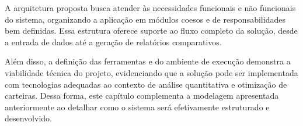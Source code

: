 \documentclass[
	12pt,				%
	openright,			%
	oneside,			    %
	a4paper,				%
	english,			%
	french,			%
	spanish,			%
	brazil			%
	]{abntex2}
\begin{document}
A arquitetura proposta busca atender às necessidades funcionais e não funcionais do sistema, organizando a aplicação em módulos coesos e de responsabilidades bem definidas. Essa estrutura oferece suporte ao fluxo completo da solução, desde a entrada de dados até a geração de relatórios comparativos.

Além disso, a definição das ferramentas e do ambiente de execução demonstra a viabilidade técnica do projeto, evidenciando que a solução pode ser implementada com tecnologias adequadas ao contexto de análise quantitativa e otimização de carteiras. Dessa forma, este capítulo complementa a modelagem apresentada anteriormente ao detalhar como o sistema será efetivamente estruturado e desenvolvido.

\postextual

%
\end{document}

